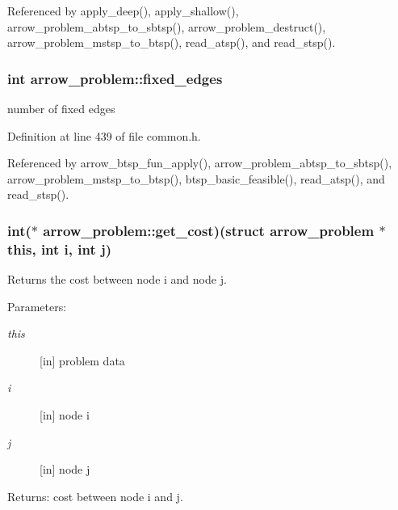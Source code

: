 Referenced by apply\_\-deep(), apply\_\-shallow(), arrow\_\-problem\_\-abtsp\_\-to\_\-sbtsp(), arrow\_\-problem\_\-destruct(), arrow\_\-problem\_\-mstsp\_\-to\_\-btsp(), read\_\-atsp(), and read\_\-stsp().\hypertarget{structarrow__problem_9d9b48847d1d9cc2d776da04d476f3a6}{
\subsubsection[{fixed\_\-edges}]{\setlength{\rightskip}{0pt plus 5cm}int {\bf arrow\_\-problem::fixed\_\-edges}}}
\label{structarrow__problem_9d9b48847d1d9cc2d776da04d476f3a6}


number of fixed edges 

Definition at line 439 of file common.h.

Referenced by arrow\_\-btsp\_\-fun\_\-apply(), arrow\_\-problem\_\-abtsp\_\-to\_\-sbtsp(), arrow\_\-problem\_\-mstsp\_\-to\_\-btsp(), btsp\_\-basic\_\-feasible(), read\_\-atsp(), and read\_\-stsp().\hypertarget{structarrow__problem_4f1f4c9ef90f240b248e8f39360da769}{
\subsubsection[{get\_\-cost}]{\setlength{\rightskip}{0pt plus 5cm}int($\ast$ {\bf arrow\_\-problem::get\_\-cost})(struct {\bf arrow\_\-problem} $\ast$this, int i, int j)}}
\label{structarrow__problem_4f1f4c9ef90f240b248e8f39360da769}


Returns the cost between node i and node j. 

\begin{Desc}
\item[Parameters:]
\begin{description}
\item[{\em this}]\mbox{[}in\mbox{]} problem data \item[{\em i}]\mbox{[}in\mbox{]} node i \item[{\em j}]\mbox{[}in\mbox{]} node j \end{description}
\end{Desc}
\begin{Desc}
\item[Returns:]cost between node i and j. \end{Desc}


